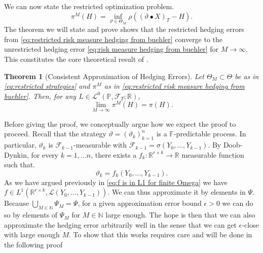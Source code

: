 \documentclass[11pt,a4paper,twoside,openany]{report}
\theoremstyle{plain} %
\newtheorem{theorem}{Theorem}[chapter]
\theoremstyle{definition} %
\theoremstyle{remark} %
\let\parencite\authnumparencite
\begin{document}
We can now state the restricted optimization problem. 
\begin{equation}\label{eq:restricted risk measure hedging from buehler}
\pi^M(H)=\inf_{\vartheta\in\Theta_M}\rho((\vartheta\bullet X)_T-H).
\end{equation}
The theorem we will state and prove shows that the restricted hedging errors from \cref{eq:restricted risk measure hedging from buehler} converge to the unrestricted hedging error \cref{eq:risk measure hedging from buehler} for \(M\to\infty\). This constitutes the core theoretical result of \parencite{Buehler2018DeepHedging}. 
\begin{theorem}[Consistent Approximation of Hedging Errors]\label{thm:approximation by restricted hedging errors}
 Let \(\Theta_M\subset \Theta\) be as in \cref{eq:restricted strategies} and \(\pi^M\) as in \cref{eq:restricted risk measure hedging from buehler}. Then, for any \(L\in\mathcal{L}^0(\mathbb{P},\mathcal{F}_T;\mathbb{R})\),
 \begin{equation}
     \lim_{M\to\infty}\pi^M(H)=\pi(H).
 \end{equation}
\end{theorem}
Before giving the proof, we conceptually argue how we expect the proof to proceed. Recall that the strategy \(\vartheta=(\vartheta_k)_{k=1}^{n}\) is a \(\mathbb{F}\)-predictable process. In particular, \(\vartheta_k\) is \(\mathcal{F}_{k-1}\)-measurable with \(\mathcal{F}_{k-1}=\sigma(Y_0,\dots,Y_{k-1})\). By Doob-Dynkin, for every \(k=1,\dots n\), there exists a \(f_k:\mathbb{R}^{r\times k}\to\mathbb{R}\) measurable function such that. 
\begin{equation}
    \vartheta_k=f_k(Y_0,\dots,Y_{k-1}).
\end{equation}
As we have argued previously in \cref{eq:f is in L1 for finite Omega} we have \(f\in L^1(\mathbb{R}^{r\times k},\mathcal{L}(Y_0,\dots,Y_{k-1}))\). We can thus approximate it by elements in \(\Psi\). Because \(\bigcup_{M\in\mathbb{N}}\Psi_M=\Psi\), for a given approximation error bound \(\epsilon>0\) we can do so by elements of \(\Psi_M\) for \(M\in\mathbb{N}\) large enough. The hope is then that we can also approximate the hedging error arbitrarily well in the sense that we can get \(\epsilon\)-close with large enough \(M\). To show that this works requires care and will be done in the following proof
\end{document}
